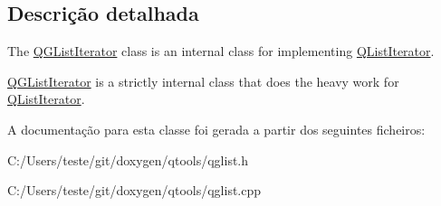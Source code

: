 \subsection{Descrição detalhada}
The \hyperlink{class_q_g_list_iterator}{Q\-G\-List\-Iterator} class is an internal class for implementing \hyperlink{class_q_list_iterator}{Q\-List\-Iterator}. 

\hyperlink{class_q_g_list_iterator}{Q\-G\-List\-Iterator} is a strictly internal class that does the heavy work for \hyperlink{class_q_list_iterator}{Q\-List\-Iterator}. 

A documentação para esta classe foi gerada a partir dos seguintes ficheiros\-:\begin{DoxyCompactItemize}
\item 
C\-:/\-Users/teste/git/doxygen/qtools/qglist.\-h\item 
C\-:/\-Users/teste/git/doxygen/qtools/qglist.\-cpp\end{DoxyCompactItemize}
